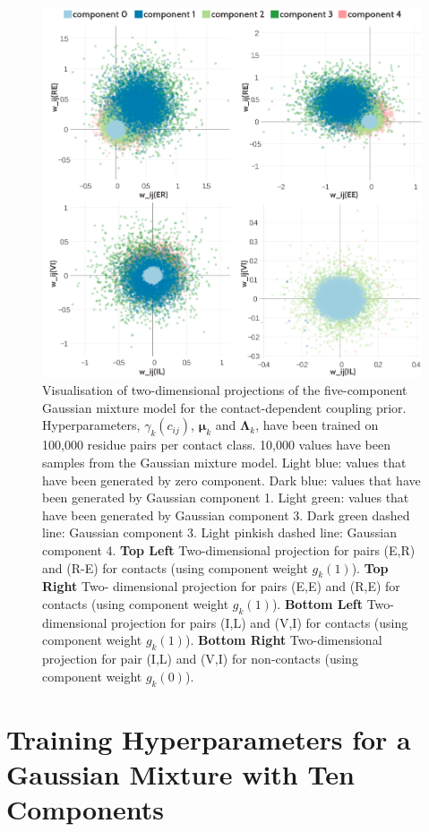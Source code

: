 \documentclass[11pt,a4paper,twoside]{book}
\newcommand{\Lk}{\mathbf{\Lambda}_k}
\newcommand{\muk}{\mathbf{\mu}_k}
\newcommand{\cij}{c_{ij}}
\theoremstyle{definition}
\theoremstyle{definition}
\theoremstyle{remark}
\begin{document}
\begin{figure}
\includegraphics[width=1\linewidth]{img/bayesian_model/pll/5/2dvis_combined_100k} \caption{Visualisation of two-dimensional
projections of the five-component Gaussian mixture model for the
contact-dependent coupling prior. Hyperparameters, \(\gamma_k(\cij)\),
\(\muk\) and \(\Lk\), have been trained on 100,000 residue pairs per
contact class. 10,000 values have been samples from the Gaussian mixture
model. Light blue: values that have been generated by zero component.
Dark blue: values that have been generated by Gaussian component 1.
Light green: values that have been generated by Gaussian component 3.
Dark green dashed line: Gaussian component 3. Light pinkish dashed line:
Gaussian component 4. \textbf{Top Left} Two-dimensional projection for
pairs (E,R) and (R-E) for contacts (using component weight \(g_k(1)\)).
\textbf{Top Right} Two- dimensional projection for pairs (E,E) and (R,E)
for contacts (using component weight \(g_k(1)\)). \textbf{Bottom Left}
Two-dimensional projection for pairs (I,L) and (V,I) for contacts (using
component weight \(g_k(1)\)). \textbf{Bottom Right} Two-dimensional
projection for pair (I,L) and (V,I) for non-contacts (using component
weight \(g_k(0)\)).}\label{fig:vis2d-pll-5comp-100k}
\end{figure}

\section{Training Hyperparameters for a Gaussian Mixture with Ten
Components}\label{training-hyperparameters-for-a-gaussian-mixture-with-ten-components}
\end{document}
